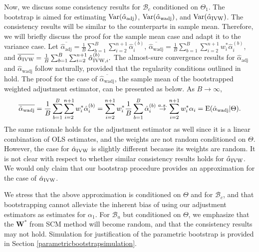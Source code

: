 \documentclass[11pt]{article}
\def\mrm#1{\mathrm{#1}} %
\def\mc#1{\mathcal{#1}} %
\def\E#1{\mathrm{E}(#1)} %
\theoremstyle{definition}
\begin{document}
Now, we discuss some consistency results for $\mc{B}_c$ conditioned on $\Theta_1$. The bootstrap is aimed for estimating $\mrm{Var}(\hat{\alpha}_{\rm adj})$, $\mrm{Var}(\hat{\alpha}_{\rm wadj})$, and $\mrm{Var}(\hat{\alpha}_{\rm IVW})$. The consistency results will be similar to the counterparts in sample mean. Therefore, we will briefly discuss the proof for the sample mean case and adapt it to the variance case. Let 
$
  \overline{\hat{\alpha}_{\mrm{adj}}} 
    = \frac{1}{B} \sum_{b=1}^B \sum_{i=2}^{n+1}\hat{\alpha}_i^{(b)}
$, 
$
  \overline{\hat{\alpha}_{\mrm{wadj}}} 
    = \frac{1}{B} \sum_{b=1}^B \sum_{i=2}^{n+1}w_i^* \hat{\alpha}_i^{(b)}
$, 
and 
$
  \overline{\hat{\alpha}_{\mrm{IVW}}} 
    = \frac{1}{B} \sum_{b=1}^B \sum_{i=2}^{n+1}\hat{\alpha}_{{\rm IVW}, i}^{(b)}.
$
The almost-sure convergence results for $\hat{\alpha}_{\mrm{adj}}$ and $\hat{\alpha}_{\mrm{wadj}}$ follow naturally, provided that the regularity conditions outlined in \citet{bose1988edgeworth} hold. The proof for the case of $\overline{\hat{\alpha}_{\mrm{wadj}}}$, the sample mean of the bootstrapped weighted adjustment estimator, can be presented as below. As $B \to \infty$,
\begin{align*}
  \overline{\hat{\alpha}_{\mrm{wadj}}}
  = \frac{1}{B} \sum_{b=1}^B \sum_{i=2}^{n+1}w_i^* \hat{\alpha}_i^{(b)}
  = \sum_{i=2}^{n+1}w_i^* \frac{1}{B} \sum_{b=1}^B\hat{\alpha}_i^{(b)}
  \overset{a.s.}{\rightarrow} \sum_{i=2}^{n+1}w_i^* \alpha_i 
  =\E{\hat{\alpha}_{\rm wadj}|\Theta}.
\end{align*}
The same rationale holds for the adjustment estimator as well since it is a linear combination of OLS estimates, and the weights are not random conditioned on $\Theta$. However, the case for $\hat{\alpha}_{\rm IVW}$ is slightly different because its weights are random. It is not clear with respect to whether similar consistency results holds for $\hat{\alpha}_{\rm IVW}$. We would only claim that our bootstrap procedure provides an approximation for the case of $\hat{\alpha}_{\rm IVW}$.





We stress that the above approximation is conditioned on $\Theta$ and for $\mc{B}_c$, and that bootstrapping cannot alleviate the inherent bias of using our adjustment estimators as estimates for $\alpha_1$. %
For $\mc{B}_u$ but conditioned on $\Theta$, we emphasize that the $\mathbf{W}^*$ from SCM method will become random, and that the consistency results may not hold. Simulation for justification of the parametric bootstrap is provided in Section \ref{parametricbootstrapsimulation}.
\end{document}
